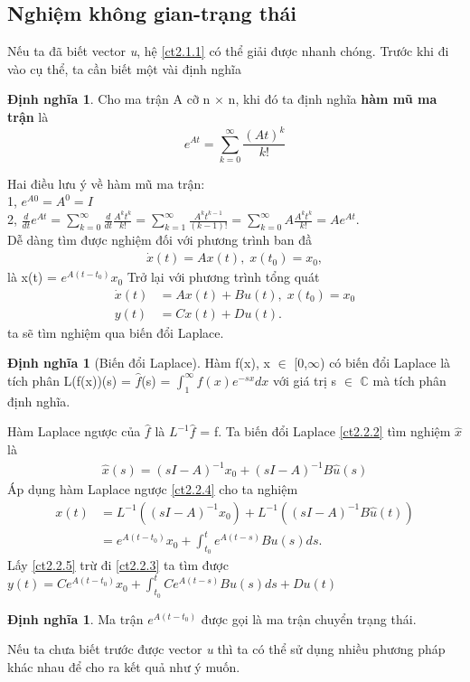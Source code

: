 \documentclass[12pt,a4paper]{article}
\theoremstyle{definition}
\newtheorem{definition}[theorem]{Định nghĩa}
\begin{document}
\subsection{Nghiệm không gian-trạng thái}
Nếu ta đã biết vector \emph{u}, hệ \eqref{ct2.1.1} có thể giải được nhanh chóng. Trước khi đi vào cụ thể, ta cần biết một vài định nghĩa \cite{5}
\begin{definition}
Cho ma trận A cỡ n $\times$ n, khi đó ta định nghĩa \textbf{hàm mũ ma trận} là \[ e^{At} = \sum_{k = 0}^{\infty} \frac{(At)^k}{k!} \]
\end{definition}
Hai điều lưu ý về hàm mũ ma trận:\\
1, \emph{$e^{A0} = A^0 = I$} \\
2, \emph{$\frac{d}{dt}e^{At} = \sum_{k = 0}^{\infty} \frac{d}{dt} \frac{A^k t^k}{k!} = \sum_{k = 1}^{\infty} \frac{A^k t^{k-1}}{(k-1)!} = \sum_{k = 0}^{\infty}A\frac{A^k t^k}{k!} = Ae^{At}$}.\\
Dễ dàng tìm được nghiệm đối với phương trình ban đầ 
\begin{align}
    \dot{x}(t) = Ax(t),\; x(t_0) = x_0, 
\end{align}
là x(t) = $e^{A(t-t_0)}x_0$
Trở lại với phương trình tổng quát
\begin{align}
    \dot{x}(t) &= Ax(t) + Bu(t), \; x(t_0) = x_0 \label{ct2.2.2} \\ 
    y(t) &= Cx(t) + Du(t). \label{ct2.2.3}
\end{align}
ta sẽ tìm nghiệm qua biến đổi Laplace.
\begin{definition}[Biến đổi Laplace]
Hàm f(x), x $\in$ [0,$\infty$) có biến đổi Laplace là tích phân L(f(x))(s) = $\hat{f}$(s) = $\displaystyle \int_1^\infty f(x)e^{-sx}dx$ với giá trị s $\in$ $\mathbb{C}$ mà tích phân định nghĩa.
\end{definition}
Hàm Laplace ngược của $\hat{f}$ là $L^{-1} \hat{f}$ = f. Ta biến đổi Laplace \eqref{ct2.2.2} tìm nghiệm $\hat{x}$ là
\begin{align}
    \hat{x}(s) = (sI - A)^{-1} x_0 + (sI - A)^{-1} B \hat{u}(s) \label{ct2.2.4}
\end{align}
Áp dụng hàm Laplace ngược \eqref{ct2.2.4} cho ta nghiệm
\begin{align}
    x(t) &= L^{-1}((sI - A)^{-1} x_0) + L^{-1}((sI - A)^{-1} B \hat{u}(t)) \nonumber\\
         &= e^{A(t-t_0)}{x_0} + \displaystyle \int_{t_0}^t e^{A(t-s)}Bu(s)ds. \label{ct2.2.5}
\end{align}
Lấy \eqref{ct2.2.5} trừ đi \eqref{ct2.2.3} ta tìm được $y(t) = Ce^{A(t-t_0)}x_0 + \int_{t_0}^t Ce^{A(t-s)}Bu(s)ds + Du(t)$
\begin{definition}
Ma trận $e^{A(t-t_0)}$ được gọi là ma trận chuyển trạng thái.
\end{definition}
Nếu ta chưa biết trước được vector \emph{u} thì ta có thể sử dụng nhiều phương pháp khác nhau để cho ra kết quả như ý muốn.
\end{document}
